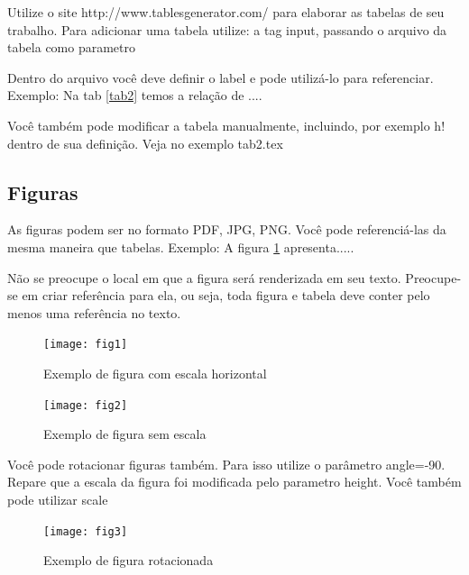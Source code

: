 \documentclass[	DIV=calc,%
							paper=a4,%
							fontsize=12pt,%
							onecolumn]{scrartcl}	 					%
\begin{document}
Utilize o site http://www.tablesgenerator.com/ para elaborar as tabelas de seu trabalho.
Para adicionar uma tabela utilize: a tag input, passando o arquivo da tabela como parametro



Dentro do arquivo você deve definir o label e pode utilizá-lo para referenciar. Exemplo:
Na tab \ref{tab2} temos a relação de ....


Você também pode modificar a tabela manualmente, incluindo, por exemplo h! dentro de sua definição. Veja no exemplo tab2.tex

\subsection{Figuras}

As figuras podem ser no formato PDF, JPG, PNG. Você pode referenciá-las da mesma maneira que tabelas. Exemplo: A figura \ref{fig1} apresenta.....

Não se preocupe o local em que a figura será renderizada em seu texto. Preocupe-se em criar referência para ela, ou seja, toda figura e tabela deve conter pelo menos uma referência no texto.

\begin{figure}
\centering
\texttt{[image: fig1]}
\caption{Exemplo de figura com escala horizontal}
\label{fig1}
\end{figure}


\begin{figure}
	\centering
	\texttt{[image: fig2]}
	\caption{Exemplo de figura sem escala}
	\label{fig2}
\end{figure}

Você pode rotacionar figuras também. Para isso utilize o parâmetro angle=-90. Repare que a escala da figura foi modificada pelo parametro height. Você também pode utilizar scale

\begin{figure}
	\centering
	\texttt{[image: fig3]}
	\caption{Exemplo de figura rotacionada}
	\label{fig3}
\end{figure}


\end{document}
